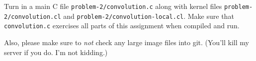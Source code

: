 \documentclass[11pt]{article}
\begin{document}
Turn in a main C file \texttt{problem-2/convolution.c} along with
kernel files \texttt{problem-2/convolution.cl} and
\texttt{problem-2/convolution-local.cl}. Make sure that
\texttt{convolution.c} exercises all parts of this assignment when
compiled and run.

Also, please make sure to \emph{not} check any large image files
into git. (You'll kill my server if you do. I'm not kidding.)
\end{document}
